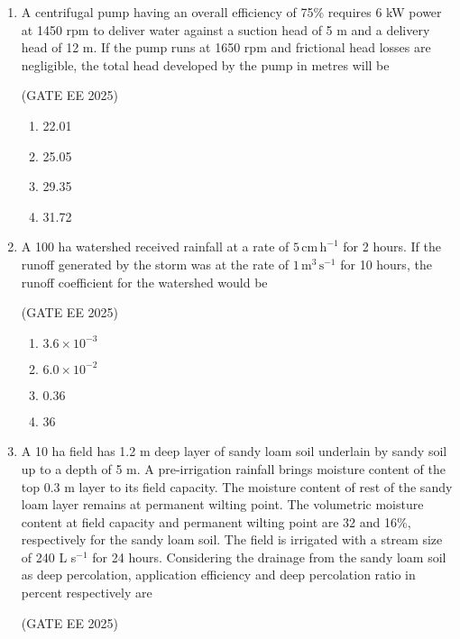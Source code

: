\documentclass[journal,12pt,onecolumn]{IEEEtran}
\theoremstyle{remark}
\begin{document}
\begin{enumerate}
\item A centrifugal pump having an overall efficiency of 75\% requires 6 kW power at 1450 rpm to deliver water against a suction head of 5 m and a delivery head of 12 m. If the pump runs at 1650 rpm and frictional head losses are negligible, the total head developed by the pump in metres will be\

\hfill(GATE EE 2025)

\begin{multicols}{4}
\begin{enumerate}
    \item 22.01
    \item 25.05
    \item 29.35
    \item 31.72
\end{enumerate}
\end{multicols}

\item A 100 ha watershed received rainfall at a rate of $5\,\mathrm{cm\,h^{-1}}$ for 2 hours. If the runoff generated by the storm was at the rate of $1\,\mathrm{m^{3}\,s^{-1}}$ for 10 hours, the runoff coefficient for the watershed would be\

\hfill(GATE EE 2025)

\begin{multicols}{4}
\begin{enumerate}
    \item $3.6\times10^{-3}$ 
    \item $6.0\times10^{-2}$
    \item $ 0.36 $
    \item 36
\end{enumerate}
\end{multicols}

\item A 10 ha field has 1.2 m deep layer of sandy loam soil underlain by sandy soil up to a depth of 5 m. A pre-irrigation rainfall brings moisture content of the top 0.3 m layer to its field capacity. The moisture content of rest of the sandy loam layer remains at permanent wilting point. The volumetric moisture content at field capacity and permanent wilting point are 32 and 16\%, respectively for the sandy loam soil. The field is irrigated with a stream size of 240 L s$^{-1}$ for 24 hours. Considering the drainage from the sandy loam soil as deep percolation, application efficiency and deep percolation ratio in percent respectively are\

\hfill(GATE EE 2025)


\end{enumerate}
\end{document}
